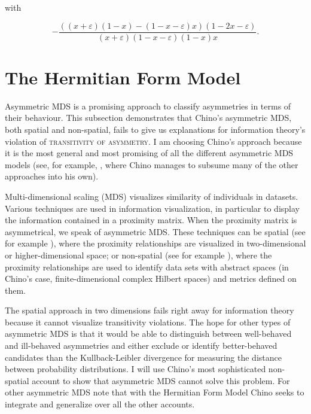 \documentclass[phd,12pt,oneside]{ubcthesis}
\begin{document}
with

\begin{equation}
  \label{eq:lpder}
  -\frac{{\left({\left(x + \varepsilon\right)} {\left(1 - x\right)} - {\left(1 - x - \varepsilon\right)} x\right)} {\left(1-2x-\varepsilon\right)}}{{\left(x + \varepsilon\right)} {\left(1-x-\varepsilon\right)} {\left(1-x\right)} x}.
\end{equation}

\chapter{The Hermitian Form Model}
\label{app:eekiquom}

Asymmetric MDS is a promising approach to classify asymmetries in
terms of their behaviour. This subsection demonstrates that Chino's
asymmetric MDS, both spatial and non-spatial, fails to give us
explanations for information theory's violation of
\textsc{transitivity of asymmetry}. I am choosing Chino's approach
because it is the most general and most promising of all the different
asymmetric MDS models (see, for example, ,
where Chino manages to subsume many of the other approaches into his
own).

Multi-dimensional scaling (MDS) visualizes similarity of individuals
in data\-sets. Various techniques are used in information visualization,
in particular to display the information contained in a proximity
matrix. When the proximity matrix is asymmetrical, we speak of
asymmetric MDS. These techniques can be spatial (see for example
), where the proximity relationships are
visualized in two-dimensional or higher-dimensional space; or
non-spatial (see for example ), where the
proximity relationships are used to identify data sets with abstract
spaces (in Chino's case, finite-dimensional complex Hilbert spaces)
and metrics defined on them.

The spatial approach in two dimensions fails right away for
information theory because it cannot visualize transitivity
violations. The hope for other types of asymmetric MDS is that it
would be able to distinguish between well-behaved and ill-behaved
asymmetries and either exclude or identify better-behaved candidates
than the Kullback-Leibler divergence for measuring the distance
between probability distributions. I will use Chino's most
sophisticated non-spatial account to show that asymmetric MDS cannot
solve this problem. For other asymmetric MDS note that with the
Hermitian Form Model Chino seeks to integrate and generalize over all
the other accounts. 
\end{document}
